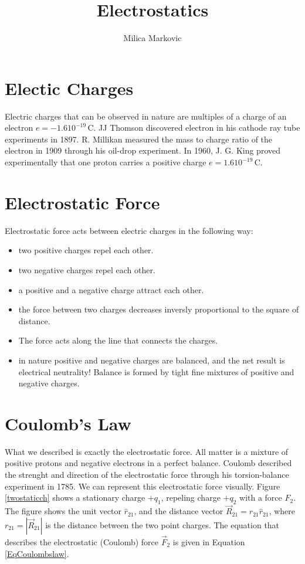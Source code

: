 \documentclass{ximera}
\title{Electrostatics}
\author{Milica Markovic}
\begin{document}
  
\begin{abstract}  

\end{abstract}  
\maketitle    



\section{Electic Charges}
 Electric charges that can be observed in nature are multiples of a charge of an electron $e=-1.6 10^{-19}$\,C. JJ Thomson discovered electron in his cathode ray tube experiments in  1897. R. Millikan measured the mass to charge ratio of the electron in 1909 through his oil-drop experiment.  In 1960, J. G. King proved experimentally that one proton carries a positive charge $e=1.6 10^{-19}$\,C. 

\section{Electrostatic Force}

Electrostatic force acts between electric charges in the following way:

\begin{itemize}
\item two positive charges repel each other.
\item two negative charges repel each other.
\item a positive and a negative charge attract each other.
\item the force between two charges decreases inversly proportional to the square of distance.
\item The force acts along the line that connects the charges.
\item in nature positive and negative charges are balanced, and the net result is electrical neutrality! Balance is formed by tight fine mixtures of positive and negative charges.
\end{itemize}
 
 
 \section{Coulomb's Law}

What we described is exactly the electrostatic force. All matter is a mixture of positive protons and negative electrons in a perfect balance. Coulomb described the strenght and direction of the electrostatic force through his torsion-balance experiment in 1785.  We can represent this electrostatic force visually. Figure \ref{twostaticch} shows a stationary charge $+q_1$, repeling charge $+q_2$ with a force $F_{2}$. The figure shows the unit vector $\hat{r}_{21}$, and the distance vector $\vec{R}_{21}=r_{21} \hat{r}_{21}$, where $r_{21}=|\vec{R}_{21}|$ is the distance between the two point charges. The equation that describes the electrostatic (Coulomb) force $\vec{F}_2$ is given in Equation \ref{EqCoulombslaw}.
\end{document}
